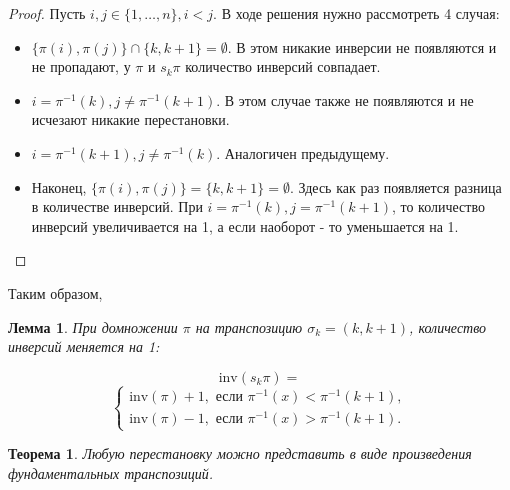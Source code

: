 \documentclass[a4paper,100pt]{article}
\theoremstyle{indented}
\newtheorem{theorem}{Теорема}
\newtheorem{lemma}{Лемма}
\theoremstyle{definition}
\theoremstyle{remark}
\begin{document}
\begin{proof}
    Пусть $i,j\in\{1,\dots,n\}, i<j$. В ходе решения нужно рассмотреть 4 случая:\ 

    \begin{itemize}
        \item $\{ \pi(i), \pi(j)\}\cap \{k,k+1\}=\emptyset $. В этом никакие инверсии не появляются и не пропадают, у $\pi$ и $s_k\pi$ количество инверсий совпадает.
        \item $i=\pi^{-1}(k), j\neq\pi^{-1}(k+1)$. В этом случае также не появляются и не исчезают никакие перестановки.
        \item $i=\pi^{-1}(k+1), j\neq\pi^{-1}(k)$. Аналогичен предыдущему.
        \item Наконец, $\{ \pi(i), \pi(j)\} = \{k,k+1\}=\emptyset $. Здесь как раз появляется разница в количестве инверсий. При $i=\pi^{-1}(k), j=\pi^{-1}(k+1)$, то количество инверсий увеличивается на 1, а если наоборот - то уменьшается на 1.
    \end{itemize}
\end{proof}

Таким образом, \\

\begin{lemma}
    При домножении $\pi$ на транспозицию $\sigma_k=(k, k+1)$, количество инверсий меняется на 1:


$$        
        \text{inv}(s_k\pi) =
$$
$$
        \begin{cases}
            \text{inv}(\pi)+1, \text{ если }\pi^{-1}(x)<\pi^{-1}(k+1),\\
            \text{inv}(\pi)-1, \text{ если }\pi^{-1}(x)>\pi^{-1}(k+1).
        \end{cases}
$$        


\end{lemma}

\begin{theorem}
    Любую перестановку можно представить в виде произведения фундаментальных транспозиций.
\end{theorem}
\end{document}
